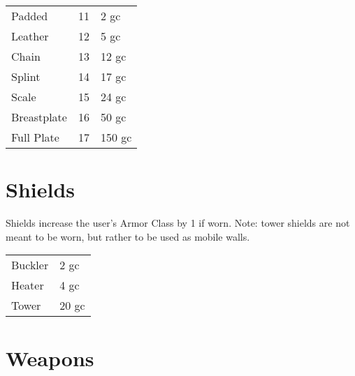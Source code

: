 \begin{center}
{
\begin{xtabular}{|l|l|l|}
Padded & 11 & 2 gc \\
Leather & 12 & 5 gc \\
Chain & 13 & 12 gc \\
Splint & 14 & 17 gc \\
Scale & 15 & 24 gc \\
Breastplate & 16 & 50 gc \\
Full Plate & 17 & 150 gc \\
\hline
\end{xtabular}
}
\end{center}

\section{Shields}

Shields increase the user's Armor Class by 1 if worn.
Note: tower shields are not meant to be worn, but rather
to be used as mobile walls.

\begin{center}
{
\begin{xtabular}{|l|l|}
Buckler & 2 gc \\
Heater & 4 gc \\
Tower & 20 gc \\
\hline
\end{xtabular}
}
\end{center}

\section{Weapons}

